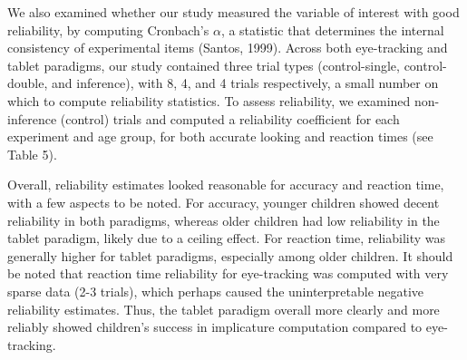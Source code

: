 \documentclass{rsos}
\begin{document}
We also examined whether our study measured the variable of interest
with good reliability, by computing Cronbach's \(\alpha\), a statistic
that determines the internal consistency of experimental items (Santos,
1999). Across both eye-tracking and tablet paradigms, our study
contained three trial types (control-single, control-double, and
inference), with 8, 4, and 4 trials respectively, a small number on
which to compute reliability statistics. To assess reliability, we
examined non-inference (control) trials and computed a reliability
coefficient for each experiment and age group, for both accurate looking
and reaction times (see Table 5).

Overall, reliability estimates looked reasonable for accuracy and
reaction time, with a few aspects to be noted. For accuracy, younger
children showed decent reliability in both paradigms, whereas older
children had low reliability in the tablet paradigm, likely due to a
ceiling effect. For reaction time, reliability was generally higher for
tablet paradigms, especially among older children. It should be noted
that reaction time reliability for eye-tracking was computed with very
sparse data (2-3 trials), which perhaps caused the uninterpretable
negative reliability estimates. Thus, the tablet paradigm overall more
clearly and more reliably showed children's success in implicature
computation compared to eye-tracking.
\end{document}
